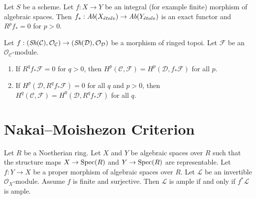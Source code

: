 \begin{lemma}
\label{lemma-finite-higher-direct-image-zero}
Let $S$ be a scheme. Let $f : X \to Y$ be an integral (for example finite)
morphism of algebraic spaces. Then
$f_* : \textit{Ab}(X_{\acute{e}tale}) \to \textit{Ab}(Y_{\acute{e}tale})$
is an exact functor and $R^pf_* = 0$ for $p > 0$.
\end{lemma}

\begin{lemma}
\label{lemma-apply-Leray}
Let $f : (\mathop{\textit{Sh}}\nolimits(\mathcal{C}), \mathcal{O}_\mathcal{C}) \to
(\mathop{\textit{Sh}}\nolimits(\mathcal{D}), \mathcal{O}_\mathcal{D})$ be a morphism of ringed topoi.
Let $\mathcal{F}$ be an $\mathcal{O}_\mathcal{C}$-module.
\begin{enumerate}
\item If $R^qf_*\mathcal{F} = 0$ for $q > 0$, then
$H^p(\mathcal{C}, \mathcal{F}) = H^p(\mathcal{D}, f_*\mathcal{F})$ for all $p$.
\item If $H^p(\mathcal{D}, R^qf_*\mathcal{F}) = 0$ for all $q$ and $p > 0$,
then $H^q(\mathcal{C}, \mathcal{F}) = H^0(\mathcal{D}, R^qf_*\mathcal{F})$
for all $q$.
\end{enumerate}
\end{lemma}



\section{Nakai--Moishezon Criterion}

\begin{lemma}
\label{lemma-surjective-finite-morphism-ample}
Let $R$ be a Noetherian ring.
Let $X$ and $Y$ be algebraic spaces over $R$ such that the structure
maps $X \to \mathop{\rm Spec}(R)$ and $Y \to \mathop{\rm Spec}(R)$ are representable.
Let $f : Y \to X$ be a proper morphism of algebraic spaces over $R$.
Let $\mathcal{L}$ be an invertible $\mathcal{O}_X$-module.
Assume $f$ is finite and surjective.
Then $\mathcal{L}$ is ample if and only if $f^*\mathcal{L}$ is ample.
\end{lemma}

